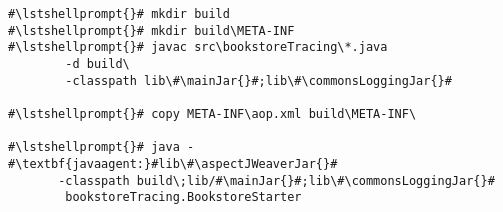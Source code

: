 \begin{lstlisting}[caption=Commands to compile and run the annotated Bookstore under Windows, label=lst:traceAnalysisCompileRunExample1Win]
#\lstshellprompt{}# mkdir build
#\lstshellprompt{}# mkdir build\META-INF
#\lstshellprompt{}# javac src\bookstoreTracing\*.java
        -d build\
        -classpath lib\#\mainJar{}#;lib\#\commonsLoggingJar{}#

#\lstshellprompt{}# copy META-INF\aop.xml build\META-INF\

#\lstshellprompt{}# java -#\textbf{javaagent:}#lib\#\aspectJWeaverJar{}# 
       -classpath build\;lib/#\mainJar{}#;lib\#\commonsLoggingJar{}# 
        bookstoreTracing.BookstoreStarter
\end{lstlisting}
